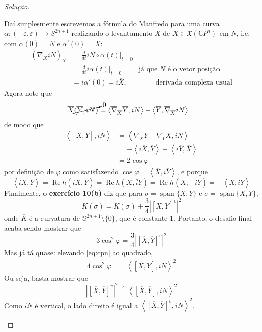 \begin{proof}[Solução]
\begin{enumerate}[label=(\alph*)]
	Daí simplesmente escrevemos a fórmula do Manfredo para uma curva \(\alpha:(-\varepsilon,\varepsilon)\to S^{2n+1}\) realizando o levantamento \(\overline{X}\) de \(X \in \mathfrak{X}(\mathbb{C}P^{n})\) em \(N\), i.e. com \(\alpha(0)=N\) e \(\alpha'(0)=\overline{X}\):
	\begin{align*}
		(\overline{\nabla}_{\overline{X}}i N)_N&=\frac{d}{dt}i N \circ \alpha(t)\Big|_{t=0}\\
		&=\frac{d}{dt}i \alpha(t)\Big|_{t=0}\qquad  \text{ já que \(N\) é o vetor posição} \\
		&=i \alpha'(0)=i\overline{X}, \qquad \qquad \text{derivada complexa usual} 
	\end{align*}
	Agora note que
	\begin{align*}
	\overline{X}\cancelto{0}{\left<\overline{Y},iN\right>}&=\left<\overline{\nabla}_{\overline{X}}\overline{Y},i N\right>+\left<\overline{Y},\overline{\nabla}_{\overline{X}}i N\right>
	\end{align*}
	de modo que
	\begin{equation}\label{eq:cpn}
		\begin{aligned}
	\left<[\overline{X},\overline{Y}],i N\right>&=\left<\overline{\nabla}_{\overline{X}}\overline{Y}-\overline{\nabla}_{\overline{Y}}\overline{X},i N\right>\\
	&=-\left<i \overline{X},\overline{Y}\right>+\left<i \overline{Y},\overline{X}\right>\\
	&=2 \cos \varphi\end{aligned}
	\end{equation}
por definição de \(\varphi\) como satisfazendo \(\cos \varphi=\left<\overline{X},i \overline{Y}\right>\), e porque \[\left<i \overline{X},\overline{Y}\right>=\operatorname{Re}h(i\overline{X},\overline{Y})=\operatorname{Re}h(\overline{X},\bar{i} \overline{Y} )=\operatorname{Re}h(\overline{X},-i \overline{Y} )=-\left<\overline{X},i \overline{Y}\right>\]
Finalmente, o \textbf{exercício 10(b)} diz que para \(\sigma=\operatorname{span}\{X,Y\}\) e \(\overline{\sigma}=\operatorname{span}\{\overline{X}, \overline{Y}\}\),
\[\boxed{K(\sigma)=\overline{K}(\overline{\sigma})+\frac{3}{4}\left|\left[ \overline{X},\overline{Y} \right]^v\right|^2}\]
onde \(\overline{K}\) é a curvatura de \(\mathbb{S}^{2n+1}\setminus\{0\}\), que é constante 1. Portanto, o desafio final acaba sendo mostrar que
\[3 \cos^2 \varphi=\frac{3}{4}\left|\left[ \overline{X},\overline{Y} \right]^v\right|^2\]
Mas já tá quase: elevando \cref{eq:cpn} ao quadrado,
\begin{align*}
4\cos^2\varphi&=\left<\left[ \overline{X},\overline{Y} \right] ,i N\right>^2
\end{align*}
Ou seja, basta mostrar que
\[\left|\left[ \overline{X},\overline{Y} \right]^v\right|^2\overset{?}{=}\left<\left[ \overline{X},\overline{Y} \right],i N\right>^2\]
Como \(i N\) é vertical, o lado direito é igual a \(\left<\left[ \overline{X},\overline{Y} \right]^v, iN\right>^2\).


\end{enumerate}
\end{proof}
